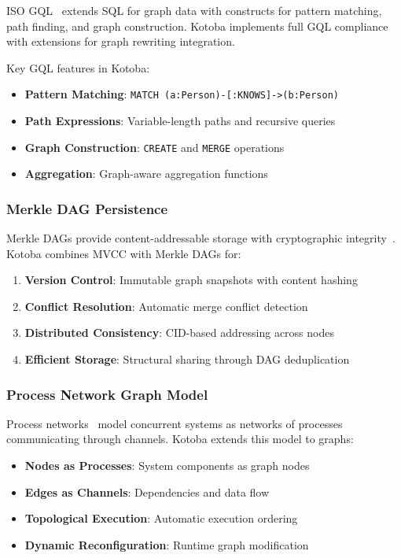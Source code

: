 \documentclass[11pt,a4paper]{article}
\begin{document}
ISO GQL~\cite{iso_gql} extends SQL for graph data with constructs for pattern matching, path finding, and graph construction. Kotoba implements full GQL compliance with extensions for graph rewriting integration.

Key GQL features in Kotoba:
\begin{itemize}
\item \textbf{Pattern Matching}: \verb|MATCH (a:Person)-[:KNOWS]->(b:Person)|
\item \textbf{Path Expressions}: Variable-length paths and recursive queries
\item \textbf{Graph Construction}: \verb|CREATE| and \verb|MERGE| operations
\item \textbf{Aggregation}: Graph-aware aggregation functions
\end{itemize}

\subsubsection{Merkle DAG Persistence}
\label{subsubsec:merkle}

Merkle DAGs provide content-addressable storage with cryptographic integrity~\cite{merkle_dag}. Kotoba combines MVCC with Merkle DAGs for:

\begin{enumerate}
\item \textbf{Version Control}: Immutable graph snapshots with content hashing
\item \textbf{Conflict Resolution}: Automatic merge conflict detection
\item \textbf{Distributed Consistency}: CID-based addressing across nodes
\item \textbf{Efficient Storage}: Structural sharing through DAG deduplication
\end{enumerate}

\subsubsection{Process Network Graph Model}
\label{subsubsec:process_network}

Process networks~\cite{kahn1974} model concurrent systems as networks of processes communicating through channels. Kotoba extends this model to graphs:

\begin{itemize}
\item \textbf{Nodes as Processes}: System components as graph nodes
\item \textbf{Edges as Channels}: Dependencies and data flow
\item \textbf{Topological Execution}: Automatic execution ordering
\item \textbf{Dynamic Reconfiguration}: Runtime graph modification
\end{itemize}
\end{document}
